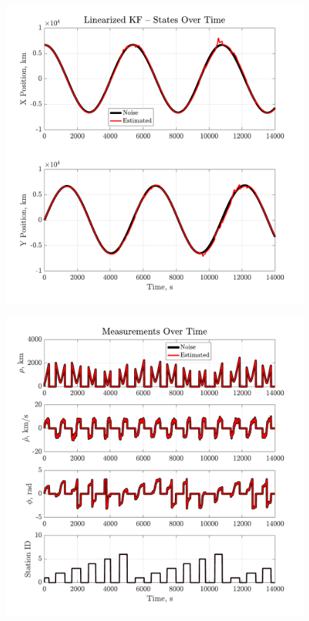 \documentclass[a4paper]{aiaa-tc}
\begin{document}
  \begin{figure}[H]
 \centering
 \includegraphics[width=\textwidth]{Figures/LKF_states.pdf}
 \end{figure}
 
  \begin{figure}[H]
 \centering
 \includegraphics[width=\textwidth]{Figures/LKF_measurements.pdf}
 \end{figure}
 
\end{document}
